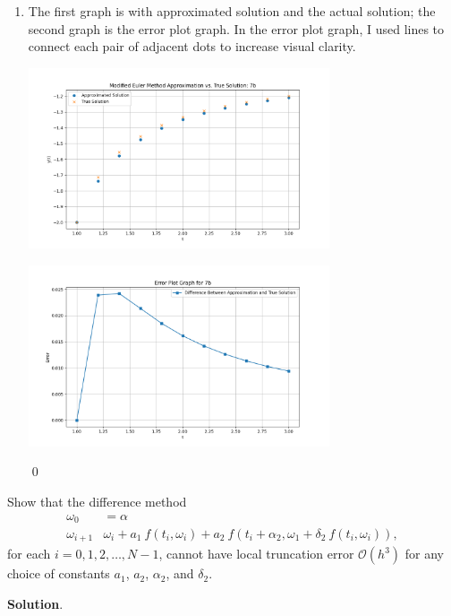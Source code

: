 \documentclass[11pt]{article}
\theoremstyle{break}
\numberwithin{equation}{theorem}
\begin{document}
\begin{enumerate}
    \item The first graph is with approximated solution and the actual solution; the second graph is the error plot graph. In the error plot graph, I used lines to connect each pair of adjacent dots to increase visual clarity.
    \begin{center}
        \includegraphics[width=0.7\textwidth]{P7b.png}
    \end{center}
    \begin{center}
        \includegraphics[width=0.7\textwidth]{P7be.png}
    \end{center} \qed
\end{enumerate}


\newpage
\begin{problem}\label{problem 8} %
    Show that the difference method 
    \begin{align*}
        \omega_0&=\alpha\\
        \omega_{i+1}&\omega_i+a_1\:f(t_i, \omega_i)+a_2\:f(t_i+\alpha_2, \omega_1+\delta_2\:f(t_i, \omega_i)),
    \end{align*}
    for each $i=0,1,2,\dots, N-1$, cannot have local truncation error $\mathcal{O}(h^3)$ for any choice of constants $a_1$, $a_2$, $\alpha_2$, and $\delta_2$.
\end{problem}
\textbf{Solution}. 
\end{document}
